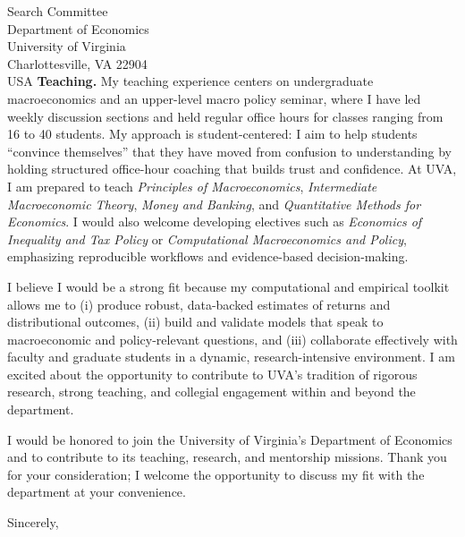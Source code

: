 \documentclass[11pt,letterpaper]{letter}
\begin{document}
\begin{letter}{Search Committee \\
Department of Economics \\
University of Virginia \\
Charlottesville, VA 22904 \\ USA}
\textbf{Teaching.} My teaching experience centers on undergraduate macroeconomics and an upper-level macro policy seminar, where I have led weekly discussion sections and held regular office hours for classes ranging from 16 to 40 students. My approach is student-centered: I aim to help students “convince themselves” that they have moved from confusion to understanding by holding structured office-hour coaching that builds trust and confidence. At UVA, I am prepared to teach \textit{Principles of Macroeconomics}, \textit{Intermediate Macroeconomic Theory}, \textit{Money and Banking}, and \textit{Quantitative Methods for Economics}. I would also welcome developing electives such as \textit{Economics of Inequality and Tax Policy} or \textit{Computational Macroeconomics and Policy}, emphasizing reproducible workflows and evidence-based decision-making.

I believe I would be a strong fit because my computational and empirical toolkit allows me to (i) produce robust, data-backed estimates of returns and distributional outcomes, (ii) build and validate models that speak to macroeconomic and policy-relevant questions, and (iii) collaborate effectively with faculty and graduate students in a dynamic, research-intensive environment. I am excited about the opportunity to contribute to UVA’s tradition of rigorous research, strong teaching, and collegial engagement within and beyond the department.

I would be honored to join the University of Virginia’s Department of Economics and to contribute to its teaching, research, and mentorship missions. Thank you for your consideration; I welcome the opportunity to discuss my fit with the department at your convenience.

\closing{Sincerely,}

\end{letter}
\end{document}
